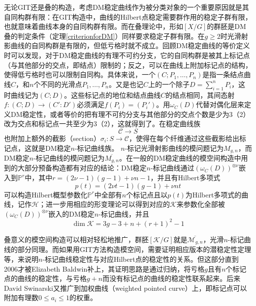 无论GIT还是叠的构造，考虑DM稳定曲线作为被分类对象的一个重要原因就是其自同构群有限：在GIT构造中，曲线的Hilbert点稳定需要群作用的稳定子群有限，也就意味着曲线本身的自同构群有限。而在叠理论中，形如$ [X/G] $的群胚是DM叠的判定条件（定理\ref{criterionforDM}）同样要求稳定子群有限。在$ g\geqslant2 $时光滑射影曲线的自同构群是有限的，但低亏格时就不成立。回顾DM稳定曲线的等价定义时可以发现，对于DM稳定曲线的有理不可约分支，它的自同构群是被其上标记点（与其他部分的交点，即结点）限制的；反之，可以在曲线上附加标记点的结构，使得低亏格时也可以限制自同构。具体来说，一个$ (C;P_1,\ldots,P_n) $是指一条结点曲线$ C $，和$ n $个不同的光滑点$ P_1,\ldots,P_n $。又是也记$ C $上的一个除子$ D=\sum_{i=1}^{n}P_i $，这时曲线记为$ (C;D) $。这些标记点的地位和结点曲线$ C $的结点相同，其间态射$ f:(C;D)\to (C':D') $必须满足$ f(P_i)=(P_i') $。用$ \omega_C(D) $代替对偶化层来定义DM稳定性，或者等价的把有理不可约分支与其他部分的交点个数是少为3（2）改为交点和标记点一共至少为3（2），这就得到了。在稳定曲线族
$$ \mathcal{C}\to S $$
也附加上额外的截影（section）$ \sigma_i:S\to \mathcal{C} $，使得在每个纤维通过这些截影给出标记点，这就是DM稳定$ n $-标记曲线族。
$ n $-标记光滑射影曲线的模问题记为$ M_{g,n} $，而DM稳定$ n $-标记曲线的模问题记为$ \overline{M_{g,n}} $。在一般的DM稳定曲线的模空间构造中用到的大部分预备构造都有对应的结论：DM稳定$ n $-标记曲线通过$ (\omega_C(D))^{\otimes \nu} $嵌入到$ \mathbb{P}^r $中，其中$ r=(2\nu-1)(g-1)+\nu n-1 $，并且有Hilbert多项式
$$ p(t)=(2\nu t-1)(g-1)+\nu nt $$
可以构造Hilbert概型参数化$ \mathbb{P}^r $中全部有$ n $个标记点且以$ p(t) $为Hilbert多项式的曲线，记作$ \mathcal{H} $；进一步用相应的形变理论可以得到对应的$ \mathcal{K} $来参数化全部被$ (\omega_C(D))^{\otimes \nu} $嵌入的DM稳定$ n $-标记曲线，并且
$$ \dim \mathcal{K}=3g-3+n+(r+1)^2-1 $$

叠意义的模空间构造可以相对轻松地推广，群胚$ [\mathcal{K}/G] $就是$ \overline{\mathscr{M}_{g,n}} $，光滑$ n $-标记曲线的部分同理。而如果用GIT方法构造模空间，需要证明相应版本的潜稳定性定理等，来说明$ n $-标记曲线稳定性与对应Hilbert点的稳定性的关系。但这部分直到2006才被Elizabeth Baldwin补上，其证明思路是通过归纳，将亏格$ g $且有$ n $个标记点的曲线的稳定性，与亏格$ g+n $而没有标记点的曲线的稳定性联系起来。后来David Swinarski又推广到加权曲线（weighted pointed curve）上，即标记点可以附加有理数$ 0\leqslant a_i \leqslant 1 $的权重。

